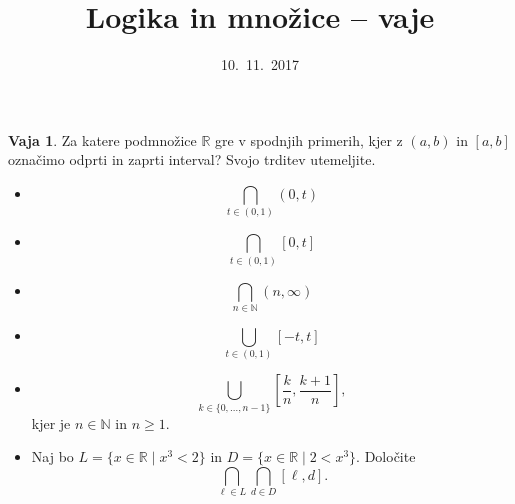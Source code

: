 \documentclass{article}
\newcommand{\NN}{\mathbb{N}}
\newcommand{\RR}{\mathbb{R}}
\theoremstyle{definition}
\newtheorem{vaja}{Vaja}
\begin{document}
\title{Logika in množice -- vaje}
\date{10.~11.~2017}
\maketitle

\begin{vaja}
  Za katere podmnožice $\RR$ gre v spodnjih primerih, kjer z $(a, b)$ in $[a, b]$ označimo odprti
  in zaprti interval? Svojo trditev utemeljite.
  \begin{itemize}
    \item
       $$ \bigcap_{t \in (0, 1)} (0, t)$$
    \item
      $$\bigcap_{t \in (0, 1)} [0, t]$$
    \item
      $$\bigcap_{n \in \NN} (n, \infty)$$
    \item
      $$\bigcup_{t \in (0, 1)} [-t, t]$$
    \item
    $$\bigcup_{k \in \{0, \ldots, n-1\}} [\frac{k}{n}, \frac{k+1}{n}],$$ kjer je $n \in \NN$ in $n \geq 1.$
    \item
      Naj bo $L = \{x \in \RR \mid x^3 < 2\}$ in $D = \{x \in \RR \mid 2 < x^3\}$.
      Določite $$\bigcap_{\ell \in L} \bigcap_{d \in D} [\ell, d].$$
  \end{itemize}
\end{vaja}

\clearpage
\end{document}
